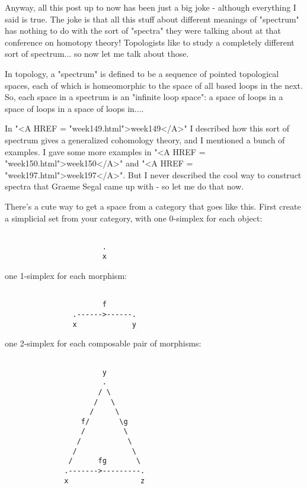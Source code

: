 Anyway, all this post up to now has been just a big joke - although everything
I said is true.  The joke is that all this stuff about different meanings of 
"spectrum" has nothing to do with the sort of "spectra" they were
talking about at that conference on homotopy theory!  Topologists like to
study a completely different sort of spectrum... so now let me talk about
those.
 
In topology, a "spectrum" is defined to be a sequence of pointed
topological spaces, each of which is homeomorphic to the space of all
based loops in the next.  So, each space in a spectrum is an "infinite
loop space": a space of loops in a space of loops in a space of loops
in....

In "<A HREF = "week149.html">week149</A>" I described how this sort of spectrum gives a generalized
cohomology theory, and I mentioned a bunch of examples. I gave some
more examples in "<A HREF = "week150.html">week150</A>" and "<A HREF = "week197.html">week197</A>".  But I never described the
cool way to construct spectra that Graeme Segal came up with - so let
me do that now.

There's a cute way to get a space from a category that goes like this.
First create a simplicial set from your category, with one 0-simplex for
each object:


\begin{verbatim}

                       .
                       x
\end{verbatim}
    
one 1-simplex for each morphism:


\begin{verbatim}

                       f
                .------>------.
                x             y
\end{verbatim}
    
one 2-simplex for each composable pair of morphisms:


\begin{verbatim}

                       y
                       .
                      / \
                     /   \
                    /     \
                  f/       \g
                  /         \
                 /           \
                /             \
               /      fg       \
              .------->---------.
              x                 z

\end{verbatim}
    
